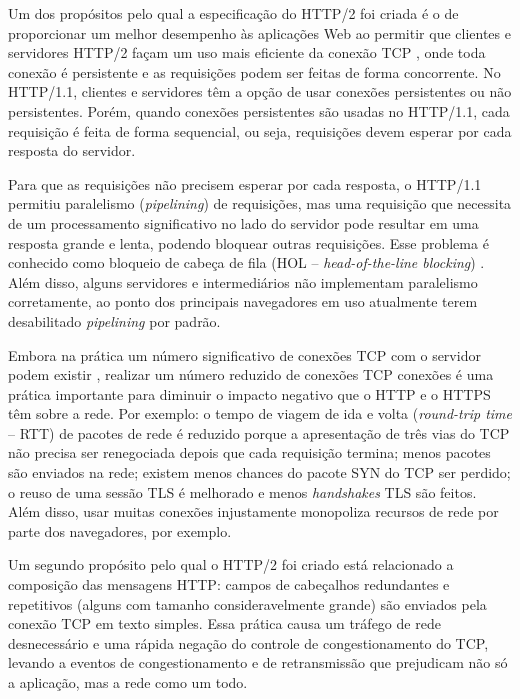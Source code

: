 Um dos propósitos pelo qual a especificação do HTTP/2 foi criada é o de proporcionar um melhor desempenho às aplicações Web ao permitir que clientes e servidores HTTP/2 façam um uso mais eficiente da conexão TCP \cite{Brylinski:2017:OH:3018896.3065841}, onde toda conexão é persistente e as requisições podem ser feitas de forma concorrente. No HTTP/1.1, clientes e servidores têm a opção de usar conexões persistentes ou não persistentes. Porém, quando conexões persistentes são usadas no HTTP/1.1, cada requisição é feita de forma sequencial, ou seja, requisições devem esperar por cada resposta do servidor.

Para que as requisições não precisem esperar por cada resposta, o HTTP/1.1 permitiu paralelismo ({\em pipelining}) de requisições, mas uma requisição que necessita de um processamento significativo no lado do servidor pode resultar em uma resposta grande e lenta, podendo bloquear outras requisições. Esse problema é conhecido como bloqueio de cabeça de fila (HOL -- {\em head-of-the-line blocking}) \cite{Kurose:2012:CNT:2584507}. Além disso, alguns servidores e intermediários não implementam paralelismo corretamente, ao ponto dos principais navegadores em uso atualmente terem desabilitado {\em pipelining} por padrão.

Embora na prática um número significativo de conexões TCP com o servidor podem existir \cite{Manzoor7818414}, realizar um número reduzido de conexões TCP conexões é uma prática importante para diminuir o impacto negativo que o HTTP e o HTTPS têm sobre a rede. Por exemplo: o tempo de viagem de ida e volta ({\em round-trip time} -- RTT) de pacotes de rede é reduzido porque a apresentação de três vias do TCP não precisa ser renegociada depois que cada requisição termina; menos pacotes são enviados na rede; existem menos chances do pacote SYN do TCP ser perdido; o reuso de uma sessão TLS é melhorado e menos {\em handshakes} TLS são feitos. Além disso, usar muitas conexões injustamente monopoliza recursos de rede por parte dos navegadores, por exemplo.

Um segundo propósito pelo qual o HTTP/2 foi criado está relacionado a composição das mensagens HTTP: campos de cabeçalhos redundantes e repetitivos (alguns com tamanho consideravelmente grande) são enviados pela conexão TCP em texto simples. Essa prática causa um tráfego de rede desnecessário e uma rápida negação do controle de congestionamento do TCP, levando a eventos de congestionamento e de retransmissão que prejudicam não só a aplicação, mas a rede como um todo.

